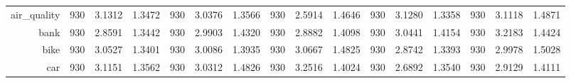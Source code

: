 \begin{table}[htbp]
{\begin{tabular}{rccccccccccccccc}
                  air\_quality                        & 930                                 & 3.1312                                                                    & 1.3472          & 930                                & 3.0376                                                                             & 1.3566          & 930                                & \cellcolor[rgb]{ .776,  .937,  .808}\textcolor[rgb]{ 0,  .38,  0}{2.5914} & 1.4646          & 930                                & 3.1280                                                                    & 1.3358          & 930                                    & 3.1118                                                                    & 1.4871          \\
                  bank                                & 930                                 & \cellcolor[rgb]{ .776,  .937,  .808}\textcolor[rgb]{ 0,  .38,  0}{2.8591} & 1.3442          & 930                                & 2.9903                                                                             & 1.4320          & 930                                & 2.8882                                                                    & 1.4098          & 930                                & 3.0441                                                                    & 1.4154          & 930                                    & 3.2183                                                                    & 1.4424          \\
                  bike                                & 930                                 & 3.0527                                                                    & 1.3401          & 930                                & 3.0086                                                                             & 1.3935          & 930                                & 3.0667                                                                    & 1.4825          & 930                                & \cellcolor[rgb]{ .776,  .937,  .808}\textcolor[rgb]{ 0,  .38,  0}{2.8742} & 1.3393          & 930                                    & 2.9978                                                                    & 1.5028          \\
                  car                                 & 930                                 & 3.1151                                                                    & 1.3562          & 930                                & 3.0312                                                                             & 1.4826          & 930                                & 3.2516                                                                    & 1.4024          & 930                                & \cellcolor[rgb]{ .776,  .937,  .808}\textcolor[rgb]{ 0,  .38,  0}{2.6892} & 1.3540          & 930                                    & 2.9129                                                                    & 1.4111          \\

\end{tabular}}
\end{table}
